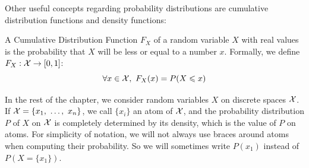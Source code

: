 Other useful concepts regarding probability distributions are cumulative distribution functions and density functions:
\begin{definition}\label{def:cdf}
    A Cumulative Distribution Function $F_X$ of a random variable $X$ with real values is the probability that $X$ will be less or equal to a number $x$. Formally, we define $F_X:{\mathcal{X}}\rightarrow[0,1]$:
    \begin{equation*}
        \forall x\in{\mathcal{X}},~F_X(x)=P(X\leqslant x)
    \end{equation*}
\end{definition}


In the rest of the chapter, we consider random variables $X$ on discrete spaces ${\mathcal{X}}$. If ${\mathcal{X}}=\{x_1,~\dots,~x_n\}$, we call $\{x_i\}$ an atom of ${\mathcal{X}}$, and the probability distribution $P$ of $X$ on ${\mathcal{X}}$ is completely determined by its density, which is the value of $P$ on atoms. For simplicity of notation, we will not always use braces around atoms when computing their probability. So we will sometimes write $P(x_1)$ instead of $P(X=\{x_1\})$.

